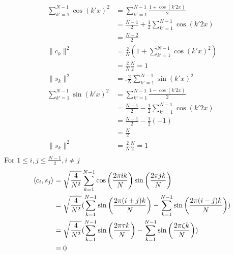 \documentclass[12pt,twoside]{article}
\begin{document}
\begin{enumerate}
\begin{enumerate}
 \ \begin{align*}			
	  \sum_{k'=1}^{N-1} \cos(k' x)^2	&=    \sum_{k'=1}^{N-1}  \frac{1 + \cos(k' 2 x)} {2} \\
	  						&=	\frac{N-1}{2} + \frac{1}{2}  \sum_{k'=1}^{N-1}  \cos(k' 2 x) \\
							&=  	\frac{N-2}{2} \\
	\|c_k\|^2 					&= 	 \frac{2}{N} (1 +  \sum_{k'=1}^{N-1} \cos(k' x)^2) \\
							&=  	\frac{2}{N} \frac{N}{2} = 1 \\	
	\|s_k\|^2 					&=.  	\frac{2}{N} \sum_{k'=1}^{N-1} \sin (k' x)^2 \\
	 \sum_{k'=1}^{N-1} \sin (k' x)^2  &= 	 \sum_{k'=1}^{N-1}  \frac{1 - \cos(k' 2 x)} {2} \\	
	 						&=	 \frac{N-1}{2} -\frac{1}{2}  \sum_{k'=1}^{N-1}  \cos(k' 2 x) \\
							&= 	 \frac{N-1}{2} -\frac{1}{2} (-1) \\
							&= 	\frac{N}{2} \\
	\|s_k\|^2 					&= 	\frac{2}{N} \frac{N}{2}  = 1\\											
 \end{align*}
For $1 \leq i,j \leq \frac{N-1}{2}, i \neq j$
 \begin{align*}
 \left \langle c_i, s_j\right \rangle		&=	 \sqrt{\frac{4}{N^2}}  \sum_{k=1}^{N-1} \cos \left( \frac{2 \pi i k }{N} \right) \sin \left( \frac{2 \pi j k }{N} \right) \\
 					&=	 \sqrt{\frac{4}{N^2}}  ( \sum_{k=1}^{N-1}  \sin \left( \frac{2 \pi (i+j) k }{N} \right) - \sum_{k=1}^{N-1}  \sin \left( \frac{2 \pi (i-j) k }{N} \right)  )\\		
					&= 	 \sqrt{\frac{4}{N^2}}  ( \sum_{k=1}^{N-1}  \sin \left( \frac{2 \pi \tau k }{N} \right) - \sum_{k=1}^{N-1}  \sin \left( \frac{2 \pi \zeta k }{N} \right)  )\\		
					&= 0
  \end{align*}
   \end{enumerate}
 

\end{enumerate}
\end{document}
